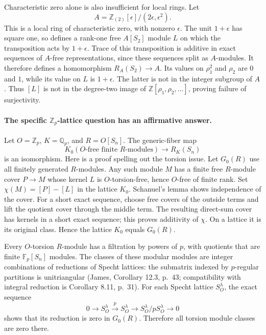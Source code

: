 Characteristic zero alone is also insufficient for local rings.
Let
\[
 A=\mathbb Z_{(2)}[\epsilon]/(2\epsilon,\epsilon^2).
\]
This is a local ring of characteristic zero, with nonzero $\epsilon$.
The unit $1+\epsilon$ has square one, so defines a rank-one free
$A[S_2]$ module $L$ on which the transposition acts by $1+\epsilon$.
Trace of this transposition is additive in exact sequences of
$A$-free representations, since these sequences split as $A$-modules.
It therefore defines a homomorphism $R_A(S_2)\to A$. Its values on
$\rho_1^2$ and $\rho_2$ are $0$ and $1$, while its value on $L$ is
$1+\epsilon$. The latter is not in the integer subgroup of $A$.
Thus $[L]$ is not in the degree-two image of
$\mathbb Z[\rho_1,\rho_2,\ldots]$, proving failure of surjectivity.

\paragraph{The specific $\mathbb Z_p$-lattice question has an affirmative answer.}
Let $O=\mathbb Z_p$, $K=\mathbb Q_p$, and $R=O[S_n]$. The generic-fiber
map
\[
 K_0(\text{$O$-free finite $R$-modules})\longrightarrow R_K(S_n)
\]
is an isomorphism. Here is a proof spelling out the torsion issue.
Let $G_0(R)$ use all finitely generated $R$-modules. Any such module
$M$ has a finite free $R$-module cover $P\to M$ whose kernel $L$ is
$O$-torsion-free, hence $O$-free of finite rank. Set
$\chi(M)=[P]-[L]$ in the lattice $K_0$. Schanuel's lemma shows
independence of the cover. For a short exact sequence, choose free
covers of the outside terms and lift the quotient cover through the
middle term. The resulting direct-sum cover has kernels in a short
exact sequence; this proves additivity of $\chi$. On a lattice it
is its original class. Hence the lattice $K_0$ equals $G_0(R)$.

Every $O$-torsion $R$-module has a filtration by powers of $p$, with
quotients that are finite $\mathbb F_p[S_n]$ modules. The classes of
these modular modules are integer combinations of reductions of
Specht lattices: the submatrix indexed by $p$-regular partitions is
unitriangular (James, Corollary 12.3, p.~43; compatibility with
integral reduction is Corollary 8.11, p.~31). For each Specht lattice
$S_O^\lambda$, the exact sequence
\[
 0\longrightarrow S_O^\lambda\xrightarrow{p}S_O^\lambda
 \longrightarrow S_O^\lambda/pS_O^\lambda\longrightarrow0
\]
shows that its reduction is zero in $G_0(R)$. Therefore all torsion
module classes are zero there.


